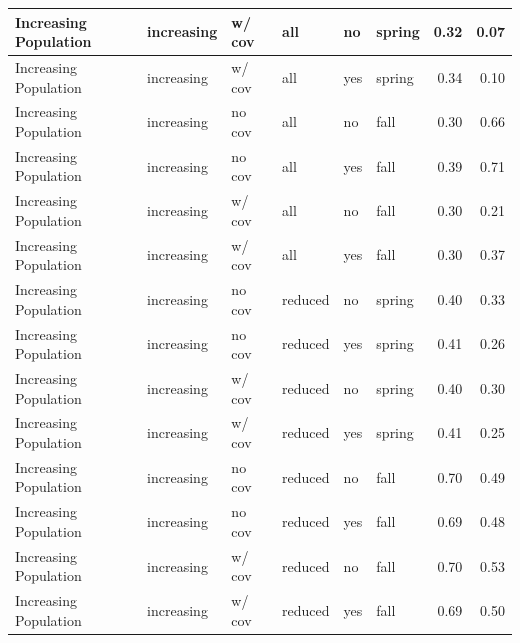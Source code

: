 \documentclass[
]{article}
\begin{document}
\begin{tabular}{l|l|l|l|l|l|r|r}
\hline
Increasing Population & increasing & w/ cov & all & no & spring & 0.32 & 0.07\\
\hline
Increasing Population & increasing & w/ cov & all & yes & spring & 0.34 & 0.10\\
\hline
Increasing Population & increasing & no cov & all & no & fall & 0.30 & 0.66\\
\hline
Increasing Population & increasing & no cov & all & yes & fall & 0.39 & 0.71\\
\hline
Increasing Population & increasing & w/ cov & all & no & fall & 0.30 & 0.21\\
\hline
Increasing Population & increasing & w/ cov & all & yes & fall & 0.30 & 0.37\\
\hline
Increasing Population & increasing & no cov & reduced & no & spring & 0.40 & 0.33\\
\hline
Increasing Population & increasing & no cov & reduced & yes & spring & 0.41 & 0.26\\
\hline
Increasing Population & increasing & w/ cov & reduced & no & spring & 0.40 & 0.30\\
\hline
Increasing Population & increasing & w/ cov & reduced & yes & spring & 0.41 & 0.25\\
\hline
Increasing Population & increasing & no cov & reduced & no & fall & 0.70 & 0.49\\
\hline
Increasing Population & increasing & no cov & reduced & yes & fall & 0.69 & 0.48\\
\hline
Increasing Population & increasing & w/ cov & reduced & no & fall & 0.70 & 0.53\\
\hline
Increasing Population & increasing & w/ cov & reduced & yes & fall & 0.69 & 0.50\\
\hline
\end{tabular}
\end{document}
